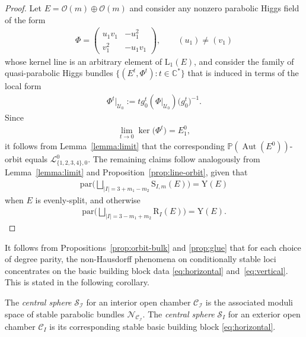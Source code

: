 \documentclass[10pt,a4paper]{amsart}
\newcommand{\field}[1]{\ensuremath{\mathbb{#1}}}
\newcommand{\CC}{\field{C}}
\newcommand{\PP}{\field{P}}
\newcommand{\calO}{\mathcal{O}}
\newcommand{\curly}[1]{\mathscr{#1}}
\newcommand{\cL}{\curly{L}}
\newcommand{\cN}{\curly{N}}
\newcommand{\cS}{\curly{S}}
\newcommand{\cU}{\curly{U}}
\newcommand{\qC}{\mathcal{C}}
\newcommand{\qI}{\mathcal{I}}
\DeclareMathOperator{\Aut}{Aut}
\numberwithin{equation}{section}
\begin{document}
\begin{proof}
Let $E = \calO(m)\oplus\calO(m)$ and consider any nonzero parabolic Higgs field of the form\vspace{-1ex}
\begin{gather*}
\Phi = \begin{pmatrix}
u_{1}v_{1} & - u_{1}^{2}\\
v_{1}^{2} & -u_{1}v_{1}
\end{pmatrix}\!,\qquad(u_{1})\neq (v_{1})
\end{gather*}
whose kernel line is an arbitrary element of $\mathrm{L}_{1}(E)$, and consider the family of quasi-parabolic Higgs bundles $\{(E^{t},\Phi^{t})\colon t\in\CC^{*}\}$ that is induced in terms of the local form\vspace{-1ex}
\begin{gather*}
\Phi^{t}\vert_{\cU_{0}} := t g^{t}_{0}(\Phi\vert_{\cU_{0}})\big(g^{t}_{0}\big)^{-1}.
\end{gather*}
Since\vspace{-1ex}
\begin{gather*}
\lim\limits_{t\to 0} \ker\big(\Phi^{t}\big) = E^{0}_{1},
\end{gather*}
it follows from Lemma~\ref{lemma:limit} that the corresponding $\PP(\Aut(E^{0}))$-orbit equals $\cL^{0}_{\{1,2,3,4\},0}$. The remaining claims follow analogously from Lemma~\ref{lemma:limit} and Proposition~\ref{prop:line-orbit}, given that\vspace{-1ex}
\begin{gather*}
\mathrm{par}\bigg( \bigsqcup_{\vert I \vert = 3 + m_{1} - m_{2}} \mathrm{S}_{I,m}(E)\bigg) = \mathrm{Y}(E)
\end{gather*}
when $E$ is evenly-split, and otherwise\vspace{-1ex}
\begin{gather*}
\mathrm{par}\bigg( \bigsqcup_{\vert I \vert = 3 - m_{1} + m_{2}} \mathrm{R}_{I}(E)\bigg) = \mathrm{Y}(E).
\tag*{\qed}
\end{gather*}
\renewcommand{\qed}{}
\end{proof}



It follows from Propositions~\ref{prop:orbit-bulk} and \ref{prop:glue} that for each choice of degree parity, the non-Hausdorff phenomena on conditionally stable loci concentrates on the basic building block data \eqref{eq:horizontal} and~\eqref{eq:vertical}. This is stated in the following corollary.

\begin{Definition}%
The \textit{central sphere} $\cS_{\qI}$ for an interior open chamber $\qC_{\qI}$ is the associated moduli space of stable parabolic bundles $\cN_{\qC_{\qI}}$. The \textit{central sphere} $\cS_{I}$ for an exterior open chamber $\qC_{I}$ is its corresponding stable basic building block \eqref{eq:horizontal}.
\end{Definition}
\end{document}
